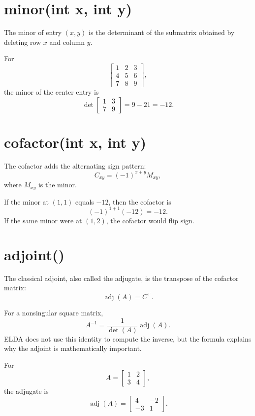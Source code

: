 \documentclass[11pt,a4paper,openany]{book}
\def\code#1{#1}%
\DeclareRobustCommand{\code}[1]{\texttt{\detokenize{#1}}}
\DeclareMathOperator{\adj}{adj}
\begin{document}
\section{\code{minor(int x, int y)}}
The minor of entry \((x,y)\) is the determinant of the submatrix obtained by deleting row \(x\) and column \(y\).

\begin{examplebox}[Example]
For
\[
\begin{bmatrix}
1 & 2 & 3 \\
4 & 5 & 6 \\
7 & 8 & 9
\end{bmatrix},
\]
the minor of the center entry is
\[
\det
\begin{bmatrix}
1 & 3 \\
7 & 9
\end{bmatrix}
= 9 - 21 = -12.
\]
\end{examplebox}

\section{\code{cofactor(int x, int y)}}
The cofactor adds the alternating sign pattern:
\[
C_{xy} = (-1)^{x+y} M_{xy},
\]
where \(M_{xy}\) is the minor.

\begin{examplebox}[Example]
If the minor at \((1,1)\) equals \(-12\), then the cofactor is
\[
(-1)^{1+1}(-12) = -12.
\]
If the same minor were at \((1,2)\), the cofactor would flip sign.
\end{examplebox}

\section{\code{adjoint()}}
The classical adjoint, also called the adjugate, is the transpose of the cofactor matrix:
\[
\adj(A) = C^\top.
\]

\begin{mathbox}
For a nonsingular square matrix,
\[
A^{-1} = \frac{1}{\det(A)} \adj(A).
\]
ELDA does not use this identity to compute the inverse, but the formula explains why the adjoint is mathematically important.
\end{mathbox}

\begin{examplebox}[Example]
For
\[
A =
\begin{bmatrix}
1 & 2 \\
3 & 4
\end{bmatrix},
\]
the adjugate is
\[
\adj(A) =
\begin{bmatrix}
4 & -2 \\
-3 & 1
\end{bmatrix}.
\]
\end{examplebox}
\end{document}
